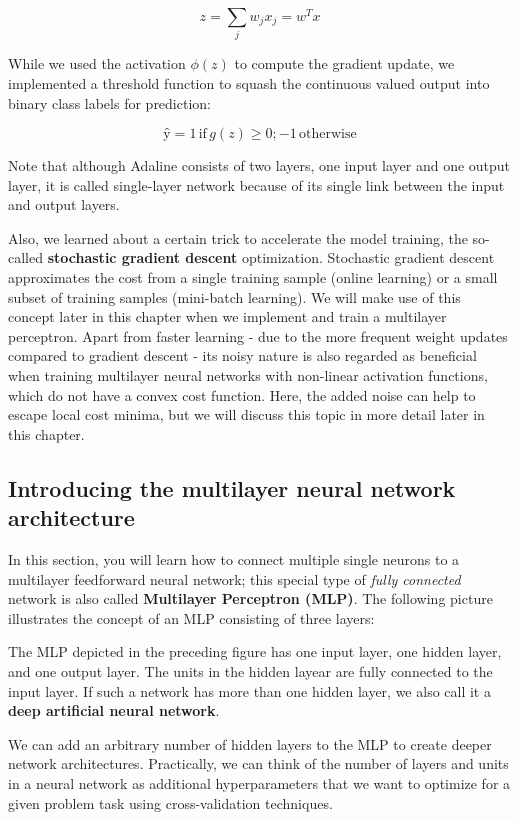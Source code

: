 \documentclass[11pt]{article}
\begin{document}
\[z = \sum_j w_jx_j = w^Tx\]

While we used the activation \(\phi(z)\) to compute the gradient update,
we implemented a threshold function to squash the continuous valued
output into binary class labels for prediction:

\[ŷ = 1 \, \text{if} \, g(z) \ge 0; -1 \, \text{otherwise}\]

Note that although Adaline consists of two layers, one input layer and
one output layer, it is called single-layer network because of its
single link between the input and output layers.

Also, we learned about a certain trick to accelerate the model training,
the so-called \textbf{stochastic gradient descent} optimization.
Stochastic gradient descent approximates the cost from a single training
sample (online learning) or a small subset of training samples
(mini-batch learning). We will make use of this concept later in this
chapter when we implement and train a multilayer perceptron. Apart from
faster learning - due to the more frequent weight updates compared to
gradient descent - its noisy nature is also regarded as beneficial when
training multilayer neural networks with non-linear activation
functions, which do not have a convex cost function. Here, the added
noise can help to escape local cost minima, but we will discuss this
topic in more detail later in this chapter.

    \subsection{Introducing the multilayer neural network
architecture}\label{introducing-the-multilayer-neural-network-architecture}

    In this section, you will learn how to connect multiple single neurons
to a multilayer feedforward neural network; this special type of
\emph{fully connected} network is also called \textbf{Multilayer
Perceptron (MLP)}. The following picture illustrates the concept of an
MLP consisting of three layers:

The MLP depicted in the preceding figure has one input layer, one hidden
layer, and one output layer. The units in the hidden layear are fully
connected to the input layer. If such a network has more than one hidden
layer, we also call it a \textbf{deep artificial neural network}.

We can add an arbitrary number of hidden layers to the MLP to create
deeper network architectures. Practically, we can think of the number of
layers and units in a neural network as additional hyperparameters that
we want to optimize for a given problem task using cross-validation
techniques.
\end{document}
